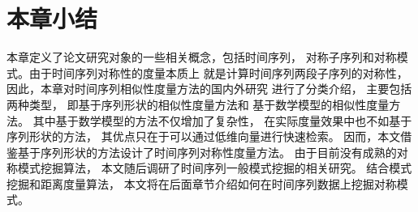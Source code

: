 \section{本章小结}
本章定义了论文研究对象的一些相关概念，包括时间序列，
对称子序列和对称模式。由于时间序列对称性的度量本质上
就是计算时间序列两段子序列的对称性，
因此，本章对时间序列相似性度量方法的国内外研究
进行了分类介绍，
主要包括两种类型，
即基于序列形状的相似性度量方法和
基于数学模型的相似性度量方法。
其中基于数学模型的方法不仅增加了复杂性，
在实际度量效果中也不如基于序列形状的方法，
其优点只在于可以通过低维向量进行快速检索。
因而，本文借鉴基于序列形状的方法设计了时间序列对称性度量方法。
由于目前没有成熟的对称模式挖掘算法，
本文随后调研了时间序列一般模式挖掘的相关研究。
结合模式挖掘和距离度量算法，
本文将在后面章节介绍如何在时间序列数据上挖掘对称模式。